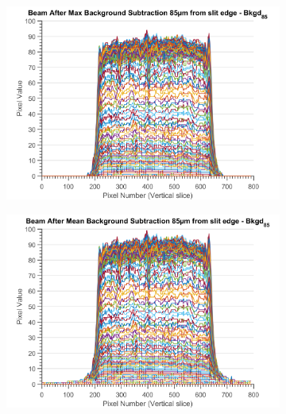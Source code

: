 \begin{figure}
\ContinuedFloat
	\centering
	\begin{subfigure}[b]{0.45\textwidth}
                \centering
                \includegraphics[width=\textwidth]{figures/beam/fig_beam_blind_thres225_max.pdf}
                \caption{}
                \label{figallbeams10}
        \end{subfigure}
				\qquad
        \begin{subfigure}[b]{0.45\textwidth}
                \centering
                \includegraphics[width=\textwidth]{figures/beam/fig_beam_blind_thres225_mean.pdf}
                \caption{}
                \label{figallbeams11}
        \end{subfigure}
				\\
				\begin{subfigure}[b]{0.45\textwidth}

\end{subfigure}
\end{figure}

